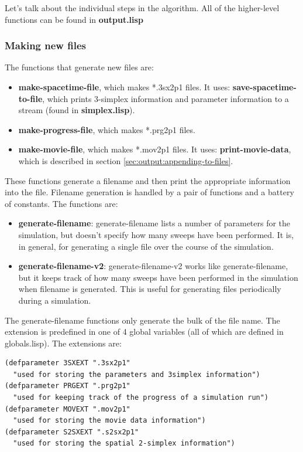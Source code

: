 \documentclass[12pt]{article}
\begin{document}
Let's talk about the individual steps in the algorithm. All of the
higher-level functions can be found in \textbf{output.lisp}

\subsubsection{Making new files}
\label{sec:output-new-files}

The functions that generate new files are:

\begin{itemize}
\item \textbf{make-spacetime-file}, which makes *.3sx2p1 files. It
  uses: 
  \subitem \textbf{save-spacetime-to-file}, which prints
  3-simplex information and parameter information to a stream (found
  in \textbf{simplex.lisp}).
\item \textbf{make-progress-file}, which makes *.prg2p1 files.
\item \textbf{make-movie-file}, which makes *.mov2p1 files. It uses:
  \subitem \textbf{print-movie-data}, which is described in section
  \ref{sec:output:appending-to-files}.
\end{itemize}

These functions generate a filename and then print the appropriate
information into the file. Filename generation is handled by a pair of
functions and a battery of constants. The functions are:
\begin{itemize}
\item \textbf{generate-filename}: generate-filename lists a number of
parameters for the simulation, but doesn't specify how many sweeps
have been performed. It is, in general, for generating a single file
over the course of the simulation.
\item \textbf{generate-filename-v2}: generate-filename-v2 works like
  generate-filename, but it keeps track of how many sweeps have been
  performed in the simulation when filename is generated. This is
  useful for generating files periodically during a simulation.
\end{itemize}
The generate-filename functions only generate the bulk of the file
name. The extension is predefined in one of 4 global variables (all of
which are defined in globals.lisp). The extensions are:
\begin{lstlisting}
(defparameter 3SXEXT ".3sx2p1" 
  "used for storing the parameters and 3simplex information")
(defparameter PRGEXT ".prg2p1" 
  "used for keeping track of the progress of a simulation run")
(defparameter MOVEXT ".mov2p1" 
  "used for storing the movie data information")
(defparameter S2SXEXT ".s2sx2p1" 
  "used for storing the spatial 2-simplex information")
\end{lstlisting}
\end{document}
